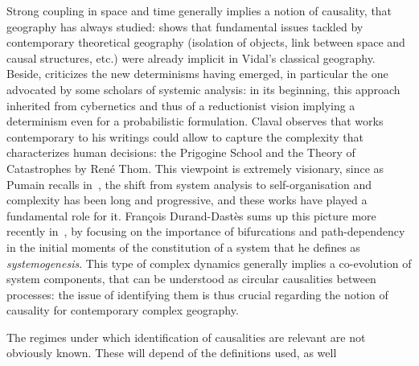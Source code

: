 \documentclass[english]{./sageo}
\begin{document}
Strong coupling in space and time generally implies a notion of causality, that geography has always studied: \cite{loi1985etude} shows that fundamental issues tackled by contemporary theoretical geography (isolation of objects, link between space and causal structures, etc.) were already implicit in Vidal's classical geography. Beside, \cite{claval1985causalite} criticizes the new determinisms having emerged, in particular the one advocated by some scholars of systemic analysis: in its beginning, this approach inherited from cybernetics and thus of a reductionist vision implying a determinism even for a probabilistic formulation. Claval observes that works contemporary to his writings could allow to capture the complexity that characterizes human decisions: the Prigogine School and the Theory of Catastrophes by René Thom. This viewpoint is extremely visionary, since as Pumain recalls in~\cite{pumain2003approche}, the shift from system analysis to self-organisation and complexity has been long and progressive, and these works have played a fundamental role for it. François Durand-Dastès sums up this picture more recently in~\cite{durand2003geographes}, by focusing on the importance of bifurcations and path-dependency in the initial moments of the constitution of a system that he defines as \emph{systemogenesis}. This type of complex dynamics generally implies a co-evolution of system components, that can be understood as circular causalities between processes: the issue of identifying them is thus crucial regarding the notion of causality for contemporary complex geography.


The regimes under which identification of causalities are relevant are not obviously known. These will depend of the definitions used, as well 
\end{document}
